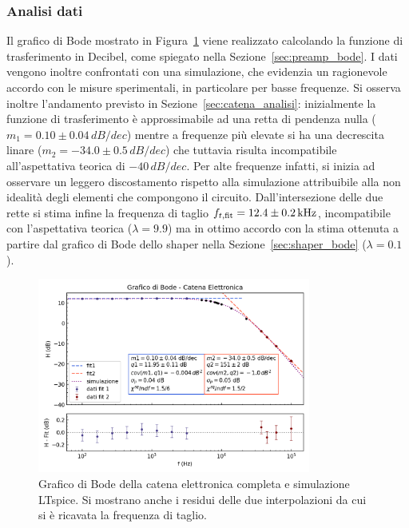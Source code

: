 \subsubsection{Analisi dati }\label{sec:catena_bode_analisi}

Il grafico di Bode mostrato in Figura~\ref{fig:catena_fit_bode} viene realizzato calcolando la
funzione di trasferimento in Decibel, come spiegato nella Sezione~\ref{sec:preamp_bode}.
I dati vengono inoltre confrontati con una simulazione, che evidenzia un ragionevole accordo con le misure sperimentali, in particolare per basse frequenze. Si osserva inoltre l'andamento
previsto in Sezione~\ref{sec:catena_analisi}: inizialmente la funzione di trasferimento
è approssimabile ad una retta di pendenza nulla ($m_{1}=0.10\pm 0.04\, dB/dec$) mentre a frequenze
più elevate si ha una decrescita linare ($m_{2}=-34.0\pm 0.5\, dB/dec$) che tuttavia risulta incompatibile all'aspettativa teorica di $-40 \,dB/dec$. Per
alte frequenze infatti, si inizia ad osservare un leggero discostamento rispetto alla simulazione attribuibile alla non idealità degli elementi
che compongono il circuito.
Dall'intersezione delle due rette si stima infine la frequenza
di taglio $f_{t,\text{fit}}=12.4\pm 0.2 \kHz$, incompatibile con l'aspettativa teorica ($\lambda=9.9$) ma
in ottimo accordo con la stima ottenuta a partire dal grafico di Bode dello shaper nella Sezione~\ref{sec:shaper_bode} ($\lambda=0.1$).
\begin{figure}[h]
\centering
\includegraphics[width=0.8\textwidth]{../ampli/images/fit_bode}
\caption{\footnotesize{Grafico di Bode della catena elettronica completa e simulazione LTspice. Si mostrano anche i residui delle due interpolazioni da cui si è ricavata la frequenza di taglio.}}\label{fig:catena_fit_bode}
\end{figure}

